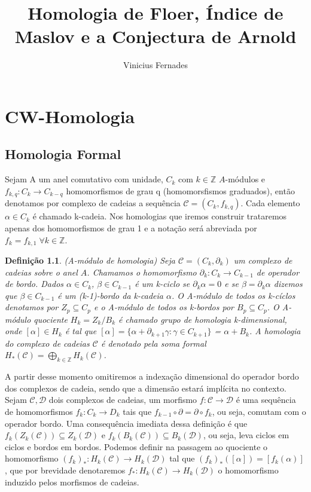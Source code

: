 \documentclass[12pt]{book}
\newtheorem{definicao}[teorema]{Definição}
\begin{document}
	
	\title{Homologia de Floer, Índice de Maslov e a Conjectura de Arnold}
	
	\author{Vinicius Fernades}
	
	\maketitle
	
	\tableofcontents
	
	\chapter{CW-Homologia}
	\section{Homologia Formal}
	Sejam A um anel comutativo com unidade, $C_{k}$ com $k \in \mathbb{Z}$ $A$-módulos e $f_{k,q}: C_{k} \to C_{k-q} $ homomorfismos de grau q (homomorsfismos graduados), então denotamos por complexo de cadeias a sequência $\mathcal{C} = (C_{k}, f_{k,q})$. Cada elemento $\alpha \in C_{k}$ é chamado k-cadeia. Nos homologias que iremos construir trataremos apenas dos homomorfismos de grau 1 e a notação será abreviada por $f_{k} = f_{k,1} \; \forall k \in \mathbb{Z}$.
	
	\begin{definicao}
		(A-módulo de homologia) Seja $\mathcal{C} = (C_{k}, \partial_{k})$ um complexo de cadeias sobre o anel $A$. Chamamos o homomorfismo $\partial_{k}: C_{k} \to C_{k-1} $ de operador de bordo. Dados $\alpha \in C_{k}$, $\beta \in C_{k-1}$  é um k-ciclo se $\partial_{k }\alpha=0$ e se $\beta =  \partial_{k }\alpha$ dizemos que $\beta \in C_{k-1}$ é um (k-1)-bordo da k-cadeia $\alpha$. O A-módulo de todos os k-cíclos denotamos por $Z_{p} \subseteq C_{p}$ e o  A-módulo de todos os k-bordos por $B_{p} \subseteq C_{p}$. O A-módulo quociente $H_{k} = Z_{k} / B_{k}$ é chamado grupo de homologia k-dimensional, onde $[\alpha] \in H_{k}$ é tal que $[\alpha] = \{\alpha+\partial_{k+1}\gamma :\gamma \in  C_{k+1}\}$ = $\alpha + B_{k}$. A homologia do complexo de cadeias $\mathcal{C}$ é denotado pela soma formal $H_{*}(\mathcal{C}) = \bigoplus_{k \in \mathbb{Z}} H_{k}(\mathcal{C})$.
	\end{definicao}
	
	A partir desse momento omitiremos a indexação dimensional do operador bordo dos complexos de cadeia, sendo que a dimensão estará implícita no contexto. Sejam $\mathcal{C}, \mathcal{D}$ dois complexos de cadeias, um morfismo $f: \mathcal{C} \to \mathcal{D}$ é uma sequência de homomorfismos $f_{k}: C_{k} \to D_{k}$ tais que $f_{k-1}\circ\partial = \partial\circ f_{k}$, ou seja, comutam com o operador bordo. Uma consequência imediata dessa definição é que $f_{k}(Z_{k}(\mathcal{C})) \subseteq Z_{k}(\mathcal{D})$ e $f_{k}(B_{k}(\mathcal{C})) \subseteq B_{k}(\mathcal{D})$, ou seja, leva ciclos em ciclos e bordos em bordos. Podemos definir na passagem ao quociente o homomorfismo $(f_{k})_{*}:H_{k}(\mathcal{C}) \to H_{k}(\mathcal{D})$ tal que $(f_{k})_{*}([\alpha]) = [f_{k}(\alpha)]$, que por brevidade denotaremos $f_{*}:H_{k}(\mathcal{C}) \to H_{k}(\mathcal{D})$ o homomorfismo induzido pelos morfismos de cadeias.
	
\end{document}
